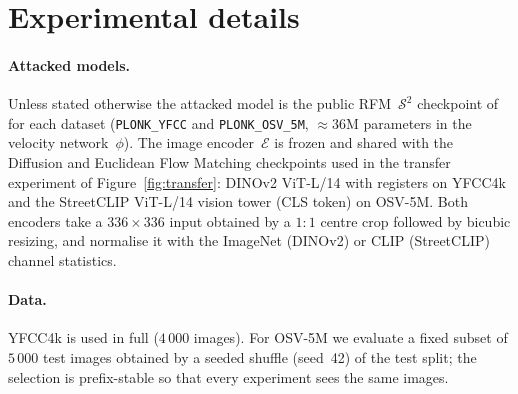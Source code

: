 \section{Experimental details}
\label{app:experimental-details}

\paragraph{Attacked models.}
Unless stated otherwise the attacked model is the public RFM~$\mathcal{S}^2$ checkpoint of
\citet{dufour2024around} for each dataset (\texttt{PLONK\_YFCC} and \texttt{PLONK\_OSV\_5M},
$\approx$36M parameters in the velocity network~$\phi$). The image encoder~$\mathcal{E}$ is
frozen and shared with the Diffusion and Euclidean Flow Matching checkpoints used in the
transfer experiment of Figure~\ref{fig:transfer}: DINOv2 ViT-L/14 with registers
\citep{oquab2024dinov2} on YFCC4k and the StreetCLIP ViT-L/14 vision tower
\citep{haas2023streetclip} (CLS token) on OSV-5M. Both encoders take a $336{\times}336$ input
obtained by a $1{:}1$ centre crop followed by bicubic resizing, and normalise it with the
ImageNet (DINOv2) or CLIP (StreetCLIP) channel statistics.

\paragraph{Data.}
YFCC4k is used in full ($4\,000$ images). For OSV-5M we evaluate a fixed subset of $5\,000$
test images obtained by a seeded shuffle (seed~42) of the test split; the selection is
prefix-stable so that every experiment sees the same images.

